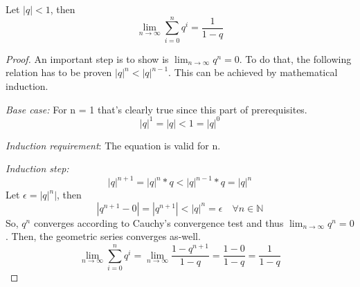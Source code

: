 \begin{lemma}
    Let $|q| < 1$, then
    \begin{equation}
        \lim_{n \to \infty}\sum_{i=0}^{n}q^i = \frac{1}{1-q}
    \end{equation}
\end{lemma}
\begin{proof}
    An important step is to show is $\lim_{n \to \infty}q^n = 0$.
    To do that, the following relation has to be proven $|q|^{n} < |q|^{n-1}$.
    This can be achieved by mathematical induction.

    \emph{Base case:} For n = 1 that's clearly true since this part of prerequisites.
    \begin{equation}
        |q|^1 = |q| < 1 = |q|^0
    \end{equation}

    \emph{Induction requirement}: The equation is valid for n.

    \emph{Induction step:} 
    \begin{equation}
        |q|^{n+1} = |q|^n * q < |q|^{n-1} * q = |q|^n 
    \end{equation}
    Let $\epsilon = |q|^n|$, then
    \begin{equation}
        |q^{n+1}-0| = |q^{n+1}| < |q|^n = \epsilon \quad \forall n \in \mathbb{N}
    \end{equation}
    So, $q^n$ converges according to Cauchy's convergence test and 
    thus $\lim_{n \to \infty}q^n = 0$.
    Then, the geometric series converges as-well.
    \begin{equation}
        \lim_{n \to \infty}\sum_{i=0}^{n}q^i = \lim_{n \to \infty}\frac{1-q^{n+1}}{1-q}
                                             = \frac{1-0}{1-q}
                                             = \frac{1}{1-q}
    \end{equation}
\end{proof}
